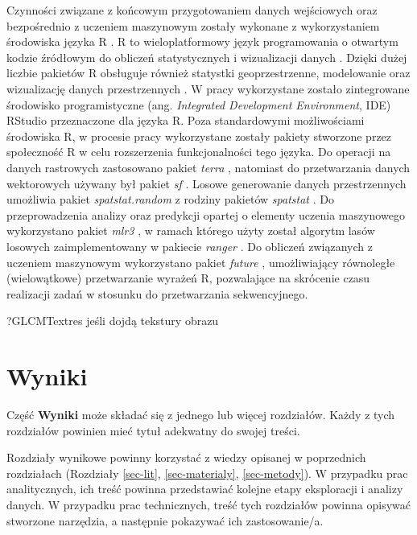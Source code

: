 \documentclass{amuthesis}
\begin{document}
Czynności związane z końcowym przygotowaniem danych wejściowych oraz
bezpośrednio z uczeniem maszynowym zostały wykonane z wykorzystaniem
środowiska języka R \autocite{R-base}. R to wieloplatformowy język
programowania o otwartym kodzie źródłowym do obliczeń statystycznych i
wizualizacji danych \autocite{lovelace_2019_geocomputation}. Dzięki
dużej liczbie pakietów R obsługuje również statystki geoprzestrzenne,
modelowanie oraz wizualizację danych przestrzennych
\autocite{lovelace_2019_geocomputation}. W pracy wykorzystane zostało
zintegrowane środowisko programistyczne (ang. \emph{Integrated
Development Environment}, IDE) RStudio
\autocite{rstudio_team_2020_rstudio} przeznaczone dla języka R. Poza
standardowymi możliwościami środowiska R, w procesie pracy wykorzystane
zostały pakiety stworzone przez społeczność R w celu rozszerzenia
funkcjonalności tego języka. Do operacji na danych rastrowych
zastosowano pakiet \emph{terra} \autocite{R-terra}, natomiast do
przetwarzania danych wektorowych używany był pakiet \emph{sf}
\autocite{R-sf}. Losowe generowanie danych przestrzennych umożliwia
pakiet \emph{spatstat.random} \autocite{R-spatstat.random} z rodziny
pakietów \emph{spatstat} \autocite{R-spatstat}. Do przeprowadzenia
analizy oraz predykcji opartej o elementy uczenia maszynowego
wykorzystano pakiet \emph{mlr3} \autocite{R-mlr3}, w ramach którego
użyty został algorytm lasów losowych zaimplementowany w pakiecie
\emph{ranger} \autocite{R-ranger}. Do obliczeń związanych z uczeniem
maszynowym wykorzystano pakiet \emph{future} \autocite{R-future},
umożliwiający równoległe (wielowątkowe) przetwarzanie wyrażeń R,
pozwalające na skrócenie czasu realizacji zadań w stosunku do
przetwarzania sekwencyjnego.

?GLCMTextres jeśli dojdą tekstury obrazu


\hypertarget{sec-wyniki}{%
\chapter{Wyniki}\label{sec-wyniki}}

Część \textbf{Wyniki} może składać się z jednego lub więcej rozdziałów.
Każdy z tych rozdziałów powinien mieć tytuł adekwatny do swojej treści.

Rozdziały wynikowe powinny korzystać z wiedzy opisanej w poprzednich
rozdziałach (Rozdziały \ref{sec-lit}, \ref{sec-materialy},
\ref{sec-metody}). W przypadku prac analitycznych, ich treść powinna
przedstawiać kolejne etapy eksploracji i analizy danych. W przypadku
prac technicznych, treść tych rozdziałów powinna opisywać stworzone
narzędzia, a następnie pokazywać ich zastosowanie/a.
\end{document}
